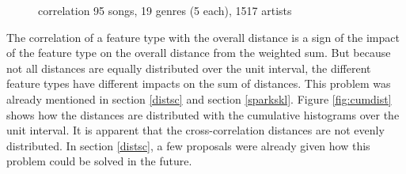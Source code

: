 \begin{figure}[htbp]
	\centering
	\caption{correlation 95 songs, 19 genres (5 each), 1517 artists}
	\label{fig:corr2}
\end{figure}\FloatBarrier

\noindent The correlation of a feature type with the overall distance is a sign of the impact of the feature type on the overall distance from the weighted sum. But because not all distances are equally distributed over the unit interval, the different feature types have different impacts on the sum of distances. This problem was already mentioned in section \ref{distsc} and section \ref{sparkskl}. Figure \ref{fig:cumdist} shows how the distances are distributed with the cumulative histograms over the unit interval. It is apparent that the cross-correlation distances are not evenly distributed. In section \ref{distsc}, a few proposals were already given how this problem could be solved in the future. 

